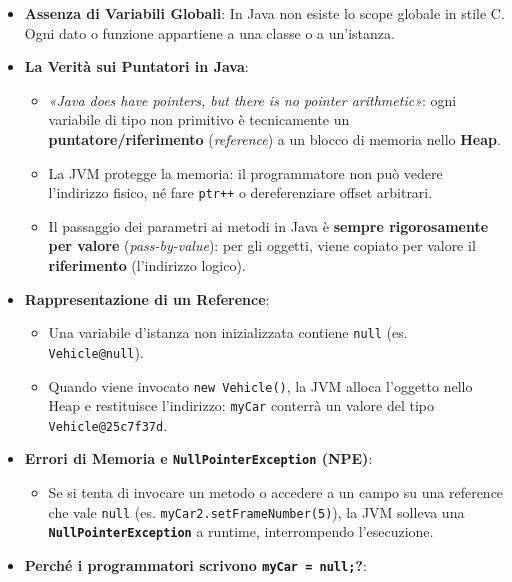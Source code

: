 \documentclass[11pt,a4paper,oneside]{report}
\newcommand{\passthrough}[1]{#1}
\providecommand{\tightlist}{\setlength{\itemsep}{0pt}\setlength{\parskip}{0pt}}
\begin{document}
\begin{itemize}
\tightlist
\item
  \textbf{Assenza di Variabili Globali}: In Java non esiste lo scope
  globale in stile C. Ogni dato o funzione appartiene a una classe o a
  un'istanza.
\item
  \textbf{La Verità sui Puntatori in Java}:

  \begin{itemize}
  \tightlist
  \item
    \emph{«Java does have pointers, but there is no pointer
    arithmetic»}: ogni variabile di tipo non primitivo è tecnicamente un
    \textbf{puntatore/riferimento} (\emph{reference}) a un blocco di
    memoria nello \textbf{Heap}.
  \item
    La JVM protegge la memoria: il programmatore non può vedere
    l'indirizzo fisico, né fare \passthrough{\lstinline!ptr++!} o
    dereferenziare offset arbitrari.
  \item
    Il passaggio dei parametri ai metodi in Java è \textbf{sempre
    rigorosamente per valore} (\emph{pass-by-value}): per gli oggetti,
    viene copiato per valore il \textbf{riferimento} (l'indirizzo
    logico).
  \end{itemize}
\item
  \textbf{Rappresentazione di un Reference}:

  \begin{itemize}
  \tightlist
  \item
    Una variabile d'istanza non inizializzata contiene
    \passthrough{\lstinline!null!} (es.
    \passthrough{\lstinline!Vehicle@null!}).
  \item
    Quando viene invocato \passthrough{\lstinline!new Vehicle()!}, la
    JVM alloca l'oggetto nello Heap e restituisce l'indirizzo:
    \passthrough{\lstinline!myCar!} conterrà un valore del tipo
    \passthrough{\lstinline!Vehicle@25c7f37d!}.
  \end{itemize}
\item
  \textbf{Errori di Memoria e
  \passthrough{\lstinline!NullPointerException!} (NPE)}:

  \begin{itemize}
  \tightlist
  \item
    Se si tenta di invocare un metodo o accedere a un campo su una
    reference che vale \passthrough{\lstinline!null!} (es.
    \passthrough{\lstinline!myCar2.setFrameNumber(5)!}), la JVM solleva
    una \textbf{\passthrough{\lstinline!NullPointerException!}} a
    runtime, interrompendo l'esecuzione.
  \end{itemize}
\item
  \textbf{Perché i programmatori scrivono
  \passthrough{\lstinline!myCar = null;!}?}:


\end{itemize}
\end{document}

